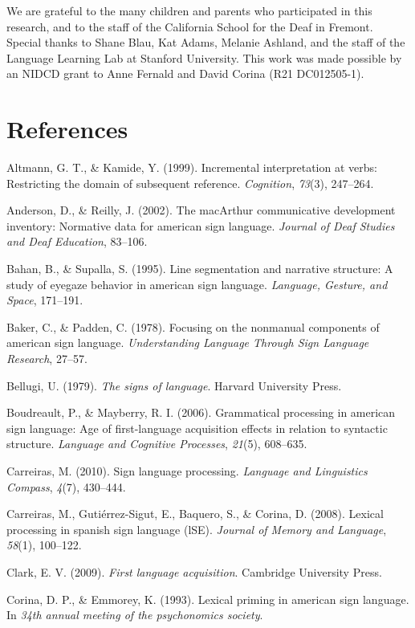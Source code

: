 \documentclass[12pt,]{article}
\begin{document}
We are grateful to the many children and parents who participated in
this research, and to the staff of the California School for the Deaf in
Fremont. Special thanks to Shane Blau, Kat Adams, Melanie Ashland, and
the staff of the Language Learning Lab at Stanford University. This work
was made possible by an NIDCD grant to Anne Fernald and David Corina
(R21 DC012505-1).

\newpage 

\section*{References}\label{references}

Altmann, G. T., \& Kamide, Y. (1999). Incremental interpretation at
verbs: Restricting the domain of subsequent reference. \emph{Cognition},
\emph{73}(3), 247--264.

Anderson, D., \& Reilly, J. (2002). The macArthur communicative
development inventory: Normative data for american sign language.
\emph{Journal of Deaf Studies and Deaf Education}, 83--106.

Bahan, B., \& Supalla, S. (1995). Line segmentation and narrative
structure: A study of eyegaze behavior in american sign language.
\emph{Language, Gesture, and Space}, 171--191.

Baker, C., \& Padden, C. (1978). Focusing on the nonmanual components of
american sign language. \emph{Understanding Language Through Sign
Language Research}, 27--57.

Bellugi, U. (1979). \emph{The signs of language}. Harvard University
Press.

Boudreault, P., \& Mayberry, R. I. (2006). Grammatical processing in
american sign language: Age of first-language acquisition effects in
relation to syntactic structure. \emph{Language and Cognitive
Processes}, \emph{21}(5), 608--635.

Carreiras, M. (2010). Sign language processing. \emph{Language and
Linguistics Compass}, \emph{4}(7), 430--444.

Carreiras, M., Guti{é}rrez-Sigut, E., Baquero, S., \& Corina, D. (2008).
Lexical processing in spanish sign language (lSE). \emph{Journal of
Memory and Language}, \emph{58}(1), 100--122.

Clark, E. V. (2009). \emph{First language acquisition}. Cambridge
University Press.

Corina, D. P., \& Emmorey, K. (1993). Lexical priming in american sign
language. In \emph{34th annual meeting of the psychonomics society}.
\end{document}
